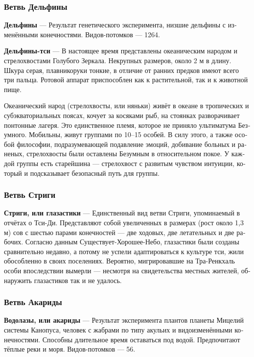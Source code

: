 \documentclass[a4paper,12pt,fleqn]{book}\usepackage{cooltooltips}\usepackage{polyglossia}\setdefaultlanguage[babelshorthands=true]{russian}\setotherlanguage{english}\defaultfontfeatures{Ligatures=TeX,Mapping=tex-text} \usepackage{xcolor}\definecolor{lightgray}{HTML}{bbbbbb}\color{lightgray}\newcommand{\ml}[3]{\textenglish{\textcolor{black}{#3}}}
\newcommand{\asterism}{\vspace{1em}{\centering\Large\bfseries$\ast~\ast~\ast$\par}\vspace{1em}}
\newcommand{\theterm}[3]{\textbf{\hypertarget{#1}{#2}} --- #3}
\begin{document}
\subsubsection{Ветвь Дельфины}

\theterm{delfina-fork}
{Дельфины}
{Результат генетического эксперимента, низшие дельфины с изменёнными конечностями.
Видов-потомков --- 1264.}

\asterism

\theterm{qi-delfina}
{Дельфины-тси}
{В настоящее время представлены океаническим народом и стрелохвостами Голубого Зеркала.
Некрупных размеров, около 2 м в длину.
Шкура серая, плавникоруки тонкие, в отличие от ранних предков имеют всего три пальца.
Ротовой аппарат приспособлен как к растительной, так и к животной пище.

Океанический народ (стрелохвосты, или няньки) живёт в океане в тропических и субэкваториальных поясах, кочует за косяками рыб, на стоянках разворачивает понтонные лагеря.
Это единственное племя, которое не приняло ультиматума Безумного.
Мобильны, живут группами по 10--15 особей.
В силу этого, а также особой философии, подразумевающей подавление эмоций, добивание больных и раненых, стрелохвосты были оставлены Безумным в относительном покое.
У каждой группы есть старейшина --- стрелохвост с развитым чувством интуиции, который и подсказывает безопасный путь для группы.}

\subsubsection{Ветвь Стриги}
 
\theterm{striges-qi}
{Стриги, или глазастики}
{Единственный вид ветви Стриги, упоминаемый в отчётах о Тси-Ди.
Представляют собой увеличенных в размерах (рост около 1,3 м) сов с шестью парами конечностей --- две ходовых, две летательных и две рабочих.
Согласно данным Существует-Хорошее-Небо, глазастики были созданы сравнительно недавно, а потому не успели адаптироваться к культуре тси, жили обособленно в своих поселениях.
Вероятно, мигрировавшие на Тра-Ренкхаль особи впоследствии вымерли --- несмотря на свидетельства местных жителей, обнаружить глазастиков так и не удалось.}

\subsubsection{Ветвь Акариды}

\theterm{acarides-fork}
{Водолазы, или акариды}
{Результат эксперимента плантов планеты Мицелий системы Канопуса, человек с жабрами по типу акульих и видоизменёнными конечностями.
Способны длительное время оставаться под водой.
Предпочитают тёплые реки и моря.
Видов-потомков --- 56.}
\end{document}
